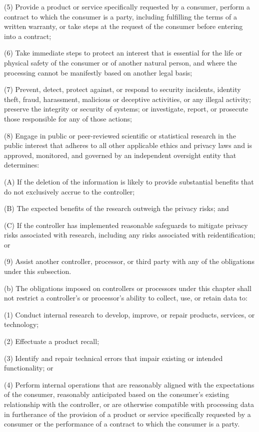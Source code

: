      (5)  Provide a product or service specifically requested by a consumer, perform a contract to which the consumer is a party, including fulfilling the terms of a written warranty, or take steps at the request of the consumer before entering into a contract;

     (6)  Take immediate steps to protect an interest that is essential for the life or physical safety of the consumer or of another natural person, and where the processing cannot be manifestly based on another legal basis;

     (7)  Prevent, detect, protect against, or respond to security incidents, identity theft, fraud, harassment, malicious or deceptive activities, or any illegal activity; preserve the integrity or security of systems; or investigate, report, or prosecute those responsible for any of those actions;

     (8)  Engage in public or peer-reviewed scientific or statistical research in the public interest that adheres to all other applicable ethics and privacy laws and is approved, monitored, and governed by an independent oversight entity that determines:

          (A)  If the deletion of the information is likely to provide substantial benefits that do not exclusively accrue to the controller;

          (B)  The expected benefits of the research outweigh the privacy risks; and

          (C)  If the controller has implemented reasonable safeguards to mitigate privacy risks associated with research, including any risks associated with reidentification; or

     (9)  Assist another controller, processor, or third party with any of the obligations under this subsection.

     (b)  The obligations imposed on controllers or processors under this chapter shall not restrict a controller's or processor's ability to collect, use, or retain data to:

     (1)  Conduct internal research to develop, improve, or repair products, services, or technology;

     (2)  Effectuate a product recall;

     (3)  Identify and repair technical errors that impair existing or intended functionality; or

     (4)  Perform internal operations that are reasonably aligned with the expectations of the consumer, reasonably anticipated based on the consumer's existing relationship with the controller, or are otherwise compatible with processing data in furtherance of the provision of a product or service specifically requested by a consumer or the performance of a contract to which the consumer is a party.

